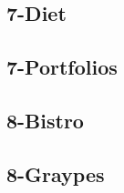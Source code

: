 \documentclass[a4paper,titlepage]{article}
\begin{document}
\subsection*{7-Diet}

\subsection*{7-Portfolios}

\subsection*{8-Bistro}

\subsection*{8-Graypes}


%
\end{document}
